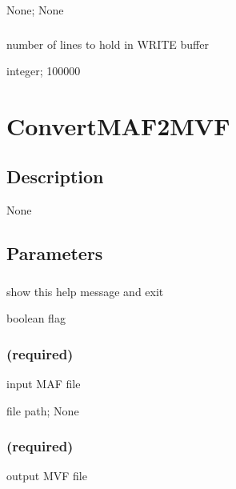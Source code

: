 \documentclass[letterpaper,11pt,english]{sphinxmanual}
\begin{document}
 None;  None


\subsubsection{}
\label{\detokenize{prog_desc:write-buffer-writebuffer}}
 number of lines to hold in WRITE buffer

 integer;  100000


\section{ConvertMAF2MVF}
\label{\detokenize{prog_desc:convertmaf2mvf}}

\subsection{Description}
\label{\detokenize{prog_desc:id7}}
None


\subsection{Parameters}
\label{\detokenize{prog_desc:id8}}

\subsubsection{}
\label{\detokenize{prog_desc:id9}}
 show this help message and exit

 boolean flag


\subsubsection{ (required)}
\label{\detokenize{prog_desc:maf-required}}
 input MAF file

 file path;  None


\subsubsection{ (required)}
\label{\detokenize{prog_desc:id10}}
 output MVF file
\end{document}
